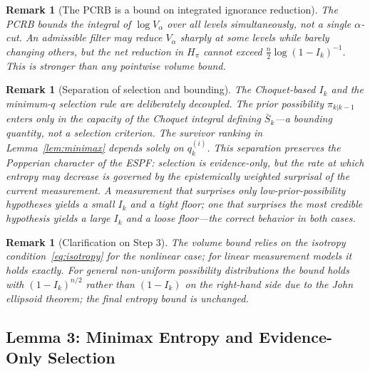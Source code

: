 \documentclass[12pt]{article}
\newtheorem{remark}[theorem]{Remark}
\begin{document}
\begin{remark}[The PCRB is a bound on integrated ignorance reduction]
The PCRB bounds the integral of $\log V_\alpha$ over all levels simultaneously, not a single $\alpha$-cut. An admissible filter may reduce $V_\alpha$ sharply at some levels while barely changing others, but the net reduction in $H_\pi$ cannot exceed $\frac{n}{2}\log(1-I_k)^{-1}$. This is stronger than any pointwise volume bound.
\end{remark}

\begin{remark}[Separation of selection and bounding]
The Choquet-based $I_k$ and the minimum-$q$ selection rule are deliberately decoupled. The prior possibility $\pi_{k|k-1}$ enters only in the capacity of the Choquet integral defining $\bar{S}_k$---a bounding quantity, not a selection criterion. The survivor ranking in Lemma~\ref{lem:minimax} depends solely on $q^{(i)}_k$. This separation preserves the Popperian character of the ESPF: selection is evidence-only, but the rate at which entropy may decrease is governed by the epistemically weighted surprisal of the current measurement. A measurement that surprises only low-prior-possibility hypotheses yields a small $I_k$ and a tight floor; one that surprises the most credible hypothesis yields a large $I_k$ and a loose floor---the correct behavior in both cases.
\end{remark}

\begin{remark}[Clarification on Step 3]
The volume bound relies on the isotropy condition~\eqref{eq:isotropy} for the nonlinear case; for linear measurement models it holds exactly. For general non-uniform possibility distributions the bound holds with $(1-I_k)^{n/2}$ rather than $(1-I_k)$ on the right-hand side due to the John ellipsoid theorem; the final entropy bound is unchanged.
\end{remark}

\subsection{Lemma 3: Minimax Entropy and Evidence-Only Selection}
\end{document}

